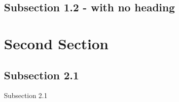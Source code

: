 \documentclass{beamer}
\begin{document}
\subsection{Subsection 1.2 - with no heading}

\begin{frame}
\end{frame}



\section{Second Section}

\subsection{Subsection 2.1}

\begin{frame}{Subsection 2.1}
\end{frame}

\end{document}

